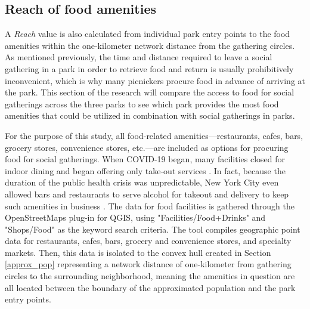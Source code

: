 \begin{multicols}{2}
    
\subsection{Reach of food amenities}
A \textit{Reach} value is also calculated from individual park entry points to the food amenities within the one-kilometer network distance from the gathering circles. As mentioned previously, the time and distance required to leave a social gathering in a park in order to retrieve food and return is usually prohibitively inconvenient, which is why many picnickers procure food in advance of arriving at the park. This section of the research will compare the access to food for social gatherings across the three parks to see which park provides the most food amenities that could be utilized in combination with social gatherings in parks.

For the purpose of this study, all food-related amenities---restaurants, cafes, bars, grocery stores, convenience stores, etc.---are included as options for procuring food for social gatherings. When COVID-19 began, many facilities closed for indoor dining and began offering only take-out services \cite{wang_adoption_2021}. In fact, because the duration of the public health crisis was unpredictable, New York City even allowed bars and restaurants to serve alcohol for takeout and delivery to keep such amenities in business \cite{del_castillo_covid_2020}. The data for food facilities is gathered through the OpenStreetMaps plug-in for QGIS, using "Facilities/Food+Drinks" and "Shops/Food" as the keyword search criteria. The tool compiles geographic point data for restaurants, cafes, bars, grocery and convenience stores, and specialty markets. Then, this data is isolated to the convex hull created in Section \ref{approx_pop} representing a network distance of one-kilometer from gathering circles to the surrounding neighborhood, meaning the amenities in question are all located between the boundary of the approximated population and the park entry points.

\end{multicols}

